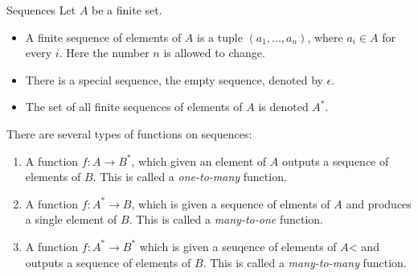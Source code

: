\documentclass[10pt]{beamer}
\begin{document}
\begin{frame}{Sequences}
  Let $A$ be a finite set.
  \begin{itemize}
\item A finite sequence of elements of $A$ is a tuple $(a_1, ..., a_n)$, where $a_i\in A$ for every $i$.  Here the number $n$ is allowed to change.
\item There is a special sequence, the empty sequence, denoted by $\epsilon$.
\item The set of all finite sequences of elements of $A$ is denoted $A^*$.
\end{itemize}
There are several types of functions on sequences:
\begin{enumerate}
  \item A function $f:A\to B^*$, which given an element of $A$ outputs a sequence of elements of $B$.  This is called a {\em one-to-many} function. %
  \item A function $f:A^*\to B$, which is given a sequence of elments of $A$ and produces a single element of $B$.  This is called a {\em many-to-one} function.  %
  \item A function $f:A^*\to B^*$ which is given a seuqence of elements of $A$< and outputs a sequence of elements of $B$.  This is called a {\em many-to-many} function.  %
\end{enumerate}
\end{frame}
\end{document}
